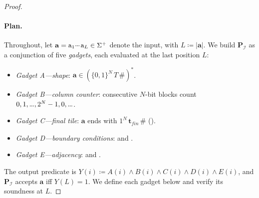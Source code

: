 \documentclass{article} %
\newcommand{\bnfdef}{\coloneqq}
\newcommand{\sym}[1]{\mathrm{#1}}
\newcommand{\str}[1]{#1}
\newcommand{\alphabet}{\Sigma}
\newcommand{\bword}{\mathbf{a}}
\newcommand{\brasp}{\boldsymbol{P}}
\newcommand{\kstar}{^*}
\newcommand{\kplus}{^+}
\newcommand{\TI}{\mathcal{I}}
\newcommand{\tileset}{T}
\newcommand{\tilefin}{\boldsymbol{t}_{\mathit{fin}}}
\newcommand{\mydots}{%
  \ifmmode
    \mathord{.}\mkern-1mu\mathord{.}\mkern-1mu\mathord{.}%
  \else
    .\kern-0.1em.\kern-0.1em.%
  \fi
}
\newcommand{\mycdots}{%
  \ifmmode
    \mathord{\raisebox{0.45ex}{\ensuremath{\mydots}}}\mkern2mu%
  \else
    \raisebox{0.45ex}{.\kern-0.1em.\kern-0.1em.}\kern0.1em%
  \fi
}
\renewcommand{\cdots}{\mycdots}%
\renewcommand{\dots}{\mydots}%
\begin{document}
\begin{proof}
\paragraph{Plan.}
Throughout, let $\str{\bword} = \sym{a}_1 \cdots \sym{a}_L \in \alphabet\kplus$ denote the input, with $L \bnfdef |\str{\bword}|$.
We build $\brasp_\TI$ as a conjunction of five \emph{gadgets}, each evaluated at the last position $L$:
\begin{itemize}[itemsep=2pt, topsep=2pt, parsep=0pt, leftmargin=2em]
    \item \emph{Gadget A---shape}: $\str{\bword} \in (\{\sym{0},\sym{1}\}^N\, \tileset\, \sym{\#})\kstar$.
    \item \emph{Gadget B---column counter}: consecutive $N$-bit blocks count $0, 1, \dots, 2^N-1, 0, \dots$.
    \item \emph{Gadget C---final tile}: $\str{\bword}$ ends with $\sym{1}^N\, \tilefin\, \sym{\#}$ ().
    \item \emph{Gadget D---boundary conditions}:  and .
    \item \emph{Gadget E---adjacency}:  and .
\end{itemize}
The output predicate is $Y(i) \bnfdef A(i) \wedge B(i) \wedge C(i) \wedge D(i) \wedge E(i)$, and $\brasp_\TI$ accepts $\str{\bword}$ iff $Y(L) = 1$. We define each gadget below and verify its soundness at $L$.


\end{proof}
\end{document}
